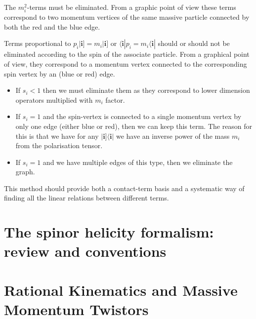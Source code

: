 \documentclass[aps,prd,nofootinbib,twocolumn,10pt]{revtex4-2}
\begin{document}
The $m_i^2$-terms must be eliminated. From a graphic point of view these terms correspond to two momentum vertices of the same massive particle connected by both the red and the blue edge.

Terms proportional to $p_i |\mathbf{i}] = m_i |\mathbf{i}]$ or $\langle \mathbf{i}| p_i = m_i \langle \mathbf{i}|$ should or should not be eliminated according to the spin of the associate particle. From a graphical point of view, they correspond to a momentum vertex connected to the corresponding spin vertex by an (blue or red) edge.
\begin{itemize}
	\item If $s_i< 1$ then we must eliminate them as they correspond to lower dimension operators multiplied with $m_i$ factor.
	\item If $s_i= 1$ and the spin-vertex is connected to a single momentum vertex by only one edge (either blue or red), then we can keep this term. The reason for this is that we have for any $|\mathbf{i}]\langle \mathbf{i}|$ we have an inverse power of the mass $m_i$ from the polarisation tensor.
	\item If $s_i= 1$ and we have multiple edges of this type, then we eliminate the graph.
\end{itemize}
This method should provide both a contact-term basis and a systematic way of finding all the linear relations between different terms.

    
\appendix

\section{The spinor helicity formalism: review and conventions}
\label{sec:spinorhelicity}

\section{Rational Kinematics and Massive Momentum Twistors}
    \label{sec:massivetwistors}



\end{document}
